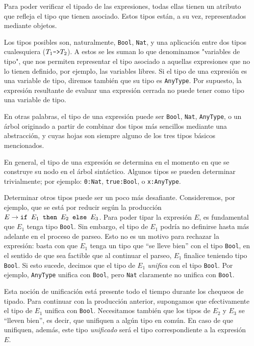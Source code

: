 \documentclass[11pt]{article}
\begin{document}
Para poder verificar el tipado de las expresiones, todas ellas tienen un
atributo que refleja el tipo que tienen asociado. Estos tipos están, a su
vez, representados mediante objetos.

Los tipos posibles son, naturalmente, \verb|Bool|, \verb|Nat|, y una
aplicación entre dos tipos cualesquiera ($T_1\verb|->|T_2$). A estos se les
suman lo que denominamos "variables de tipo", que nos permiten representar
el tipo asociado a aquellas expresiones que no lo tienen definido, por
ejemplo, las variables libres. Si el tipo de una expresión es una variable
de tipo, diremos también que su tipo es \verb|AnyType|. Por supuesto, la
expresión resultante de evaluar una expresión cerrada no puede tener como
tipo una variable de tipo.

En otras palabras, el tipo de una expresión puede ser \verb|Bool|,
\verb|Nat|, \verb|AnyType|, o un árbol originado a partir de combinar dos
tipos más sencillos mediante una abstracción, y cuyas hojas son siempre
alguno de los tres tipos básicos mencionados.

En general, el tipo de una expresión se determina en el momento en que se
construye su nodo en el árbol sintáctico. Algunos tipos se pueden determinar
trivialmente; por ejemplo: \verb|0:Nat|, \verb|true:Bool|, o 
\verb|x:AnyType|.

Determinar otros tipos puede ser un poco más desafiante. Consideremos, por
ejemplo, que se está por reducir según la producción
$E \rightarrow \verb|if | E_1 \verb| then | E_2 \verb| else | E_3$. Para
poder tipar la expresión $E$, es fundamental que $E_1$ tenga tipo
\verb|Bool|. Sin embargo, el tipo de $E_1$ podría no definirse hasta más
adelante en el proceso de parseo. Esto no es un motivo para rechazar la
expresión: basta con que $E_1$ tenga un tipo que ``se lleve bien'' con el
tipo \verb|Bool|, en el sentido de que sea factible que al continuar el
parseo, $E_1$ finalice teniendo tipo \verb|Bool|. Si esto sucede,
decimos que el tipo de $E_1$ \emph{unifica} con el tipo \verb|Bool|.
Por ejemplo, \verb|AnyType| unifica con \verb|Bool|, pero \verb|Nat|
claramente no unifica con \verb|Bool|.

Esta noción de unificación está presente todo el tiempo durante los
chequeos de tipado. Para continuar con la producción anterior, supongamos
que efectivamente el tipo de $E_1$ unifica con \verb|Bool|. Necesitamos
también que los tipos de $E_2$ y $E_3$ se ``lleven bien'', es decir, que
unifiquen a algún tipo en común. En caso de que unifiquen, además, este
tipo \emph{unificado} será el tipo correspondiente a la expresión $E$.
\end{document}
